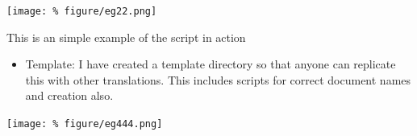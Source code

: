 \documentclass[unknownkeysallowed,usepdftitle=false, aspectratio=169, parskip=full]{beamer}
\newcommand{\secvariable}{nothing}
\newcommand{\mysection}[1]{\renewcommand{\secvariable}{#1}
}
\begin{document}
\mysection{major}
\begin{frame}\label{\secvariable} %
\begin{center}
\texttt{[image: \%
figure/eg22.png]}
\end{center}
This is an simple example of the script in action
\end{frame}

\mysection{slab}
\begin{frame}\label{\secvariable}

   \begin{flushleft}
   \parbox{\linewidth}{
\begin{itemize}
\item{Template: I have created a template directory so that anyone can replicate this with other translations. This includes scripts for correct document names and creation also.} 
\end{itemize}
}
\begin{flushright}
\texttt{[image: \%
figure/eg444.png]}
\end{flushright}
\end{flushleft}
\end{frame}








\mysection{minor}


\end{document}

